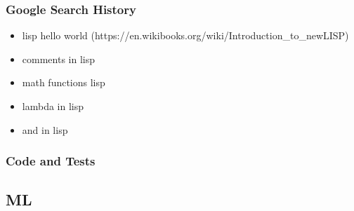 \documentclass[letterpaper, 10pt, DIV=13]{scrartcl}
\numberwithin{equation}{section}
\numberwithin{figure}{section}
\numberwithin{table}{section}
\begin{document}
\subsubsection{Google Search History}
\begin{itemize}
    \item lisp hello world (https://en.wikibooks.org/wiki/Introduction\_to\_newLISP)
    \item comments in lisp
    \item math functions lisp
    \item lambda in lisp
    \item and in lisp
\end{itemize}

\subsubsection{Code and Tests}



\subsection{ML}
\end{document}
